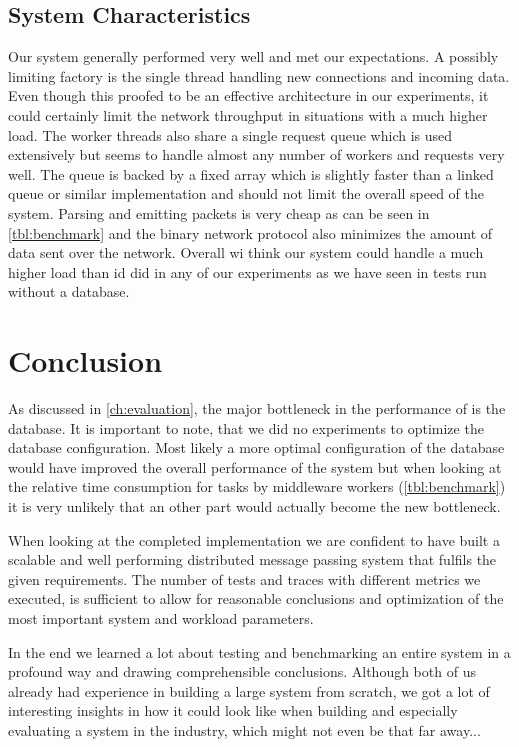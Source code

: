 \documentclass[a4paper, oneside]{csthesis}
\begin{document}
\section{System Characteristics}
	Our system generally performed very well and met our expectations. A possibly limiting factory is
	the single thread handling new connections and incoming data. Even though this proofed to be an
	effective architecture in our experiments, it could certainly limit the network throughput in
	situations with a much higher load. The worker threads also share a
	single request queue which is used extensively but seems to handle almost any number of workers
	and requests very well. The queue is backed by a fixed array which is slightly faster than
	a linked queue or similar implementation and should not limit the overall speed of the system.
	Parsing and emitting packets is very cheap as can be seen
	in \cref{tbl:benchmark} and the binary network protocol also minimizes the amount of data sent
	over the network. Overall wi think our system could handle a much higher load than id did in any
	of our experiments as we have seen in tests run without a database.

\chapter{Conclusion}
    As discussed in \cref{ch:evaluation}, the major bottleneck in the
    performance of \telesto{} is the database. It is important to note, that we
    did no experiments to optimize the database configuration. Most likely a
    more optimal configuration of the database would have improved the overall
    performance of the system but when looking at the relative time consumption
    for tasks by middleware workers (\cref{tbl:benchmark}) it is very unlikely
    that an other part would actually become the new bottleneck.
	
	When looking at the completed \telesto{} implementation we are confident to
	have built a scalable and well performing distributed message passing
	system that fulfils the given requirements. The number of tests and traces with
	different metrics we executed, is sufficient to allow for reasonable
	conclusions and optimization of the most important system and workload
	parameters.
	
	In the end we learned a lot about testing and benchmarking an entire system in
	a profound way and drawing comprehensible conclusions. Although both of us
	already had experience in building a large system from scratch, we got a lot of
	interesting insights in how it could look like when building and especially
	evaluating a system in the industry, which might not even be that far away...
	
\end{document}
